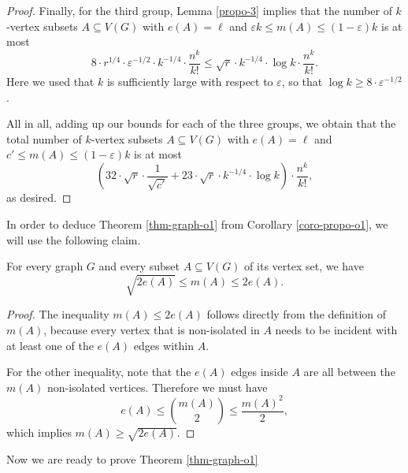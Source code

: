 \begin{proof}
Finally, for the third group, Lemma \ref{propo-3} implies that the number of $k$-vertex subsets $A\subseteq V(G)$ with $e(A)=\ell$ and $\varepsilon k\leq m(A)\leq (1-\varepsilon)k$ is at most
\[8\cdot r^{1/4}\cdot \varepsilon^{-1/2}\cdot k^{-1/4}\cdot \frac{n^k}{k!}\leq \sqrt{r}\cdot k^{-1/4}\cdot \log k\cdot \frac{n^k}{k!}.\]
Here we used that $k$ is sufficiently large with respect to $\varepsilon$, so that $\log k\geq 8\cdot \varepsilon^{-1/2}$.

All in all, adding up our bounds for each of the three groups, we obtain that the total number of $k$-vertex subsets $A\subseteq V(G)$ with $e(A)=\ell$ and $c' \leq m(A)\leq (1-\varepsilon) k$ is at most
\[\left(32\cdot \sqrt{r}\cdot \frac{1}{\sqrt{c'}}+23 \cdot \sqrt{r}\cdot k^{-1/4}\cdot \log k\right)\cdot \frac{n^k}{k!},\]
as desired.
\end{proof}

In order to deduce Theorem \ref{thm-graph-o1} from Corollary \ref{coro-propo-o1}, we will use the following claim.

\begin{claim}\label{claim-mA-bounds-graph} For every graph $G$ and every subset $A\subseteq V(G)$ of its vertex set, we have
\[\sqrt{2e(A)}\leq m(A)\leq 2e(A).\]
\end{claim}
\begin{proof}The inequality $m(A)\leq 2e(A)$ follows directly from the definition of $m(A)$, because every vertex that is non-isolated in $A$ needs to be incident with at least one of the $e(A)$ edges within $A$.

For the other inequality, note that the $e(A)$ edges inside $A$ are all between the $m(A)$ non-isolated vertices. Therefore we must have
\[e(A)\leq {m(A) \choose 2}\leq \frac{m(A)^2}{2},\]
which implies $m(A)\geq \sqrt{2e(A)}$.
\end{proof}

Now we are ready to prove Theorem \ref{thm-graph-o1}

